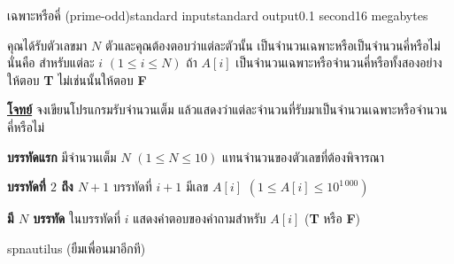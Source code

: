 \documentclass[11pt,a4paper]{article}
\begin{document}
\begin{problem}{เฉพาะหรือคี่ (prime-odd)}{standard input}{standard output}{0.1 second}{16 megabytes}

คุณได้รับตัวเลขมา $N$ ตัวและคุณต้องตอบว่าแต่ละตัวนั้น เป็นจำนวนเฉพาะหรือเป็นจำนวนคี่หรือไม่ นั่นคือ สำหรับแต่ละ $i$ $(1 \leq i \leq N)$ ถ้า $A[i]$ เป็นจำนวนเฉพาะหรือจำนวนคี่หรือทั้งสองอย่าง ให้ตอบ \textbf{T} ไม่เช่นนั้นให้ตอบ \textbf{F}


\underline{\textbf{โจทย์}} จงเขียนโปรแกรมรับจำนวนเต็ม แล้วแสดงว่าแต่ละจำนวนที่รับมาเป็นจำนวนเฉพาะหรือจำนวนคี่หรือไม่

\InputFile
 \textbf{บรรทัดแรก} มีจำนวนเต็ม $N$ $(1 \leq N \leq 10)$ แทนจำนวนของตัวเลขที่ต้องพิจารณา
 
\textbf{บรรทัดที่ $2$ ถึง $N+1$} บรรทัดที่ $i+1$ มีเลข $A[i]$ $(1 \leq A[i] \leq 10^{1\,000})$

\OutputFile

\textbf{มี $N$ บรรทัด} ในบรรทัดที่ $i$ แสดงคำตอบของคำถามสำหรับ $A[i]$ (\textbf{T }หรือ \textbf{F})

\Examples

\begin{example}
%
\end{example}

\Source

spnautilus (ยืมเพื่อนมาอีกที)

\end{problem}
\end{document}
